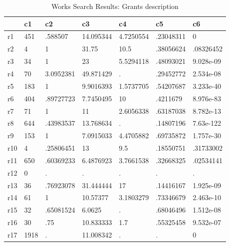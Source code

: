 \begin{table}[htbp]
\caption{\label{clabel} Works Search Results: Grants description}\centering\medskip
\begin{tabular}{|l|l|l|l|l|l|l|}\hline  
 & c1  & c2  & c3  & c4  & c5  & c6  \\ \hline  
r1 & 451 & .588507 & 14.095344 & 4.7250554 & .23048311 & 0 \\ \hline 
r2 & 4 & 1 & 31.75 & 10.5 & .38056624 & .08326452 \\ \hline 
r3 & 34 & 1 & 23 & 5.5294118 & .48093021 & 9.028e-09 \\ \hline 
r4 & 70 & 3.0952381 & 49.871429 & . & .29452772 & 2.534e-08 \\ \hline 
r5 & 183 & 1 & 9.9016393 & 1.5737705 & .54207687 & 3.233e-40 \\ \hline 
r6 & 404 & .89727723 & 7.7450495 & 10 & .4211679 & 8.976e-83 \\ \hline 
r7 & 71 & 1 & 11 & 2.6056338 & .63187038 & 8.782e-13 \\ \hline 
r8 & 644 & .43983537 & 13.768634 & . & .14807196 & 7.63e-122 \\ \hline 
r9 & 153 & 1 & 7.0915033 & 4.4705882 & .69735872 & 1.757e-30 \\ \hline 
r10 & 4 & .25806451 & 13 & 9.5 & .18550751 & .31733002 \\ \hline 
r11 & 650 & .60369233 & 6.4876923 & 3.7661538 & .32668325 & .02534141 \\ \hline 
r12 & 0 & . & . & . & . & . \\ \hline 
r13 & 36 & .76923078 & 31.444444 & 17 & .14416167 & 1.925e-09 \\ \hline 
r14 & 61 & 1 & 10.57377 & 3.1803279 & .73346679 & 2.463e-10 \\ \hline 
r15 & 32 & .65081524 & 6.0625 & . & .68046496 & 1.512e-08 \\ \hline 
r16 & 30 & .75 & 10.833333 & 1.7 & .55325458 & 9.532e-07 \\ \hline 
r17 & 1918 & . & 11.008342 & . & . & 0 \\ \hline 
  \end{tabular}
\end{table}
